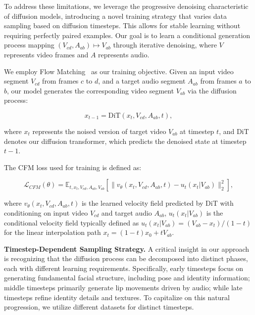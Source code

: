 To address these limitations, we leverage the progressive denoising characteristic of diffusion models, introducing a novel training strategy that varies data sampling based on diffusion timesteps. This allows for stable learning without requiring perfectly paired examples. Our goal is to learn a conditional generation process mapping $(V_{cd}, A_{ab}) \mapsto V_{ab}$ through iterative denoising, where $V$ represents video frames and $A$ represents audio.


We employ Flow Matching~\cite{lipman2022flow} as our training objective. Given an input video segment $V_{cd}$ from frames $c$ to $d$, and a target audio segment $A_{ab}$ from frames $a$ to $b$, our model generates the corresponding video segment $V_{ab}$ via the diffusion process:

\vspace{-1em}
\begin{equation}
x_{t-1} = \text{DiT}(x_t, V_{cd}, A_{ab}, t),
\end{equation}
\vspace{-1em}

where $x_t$ represents the noised version of target video $V_{ab}$ at timestep $t$, and DiT denotes our diffusion transformer, which predicts the denoised state at timestep $t-1$.

The CFM loss used for training is defined as:

\begin{equation}
\mathcal{L}_{CFM}(\theta) = \mathbb{E}_{t,x_t,V_{cd},A_{ab},V_{ab}}\left[\|v_\theta(x_t, V_{cd}, A_{ab}, t) - u_t(x_t|V_{ab})\|_2^2\right],
\end{equation}

where $v_\theta(x_t, V_{cd}, A_{ab}, t)$ is the learned velocity field predicted by DiT with conditioning on input video $V_{cd}$ and target audio $A_{ab}$, $u_t(x_t|V_{ab})$ is the conditional velocity field typically defined as $u_t(x_t|V_{ab}) = (V_{ab} - x_t)/(1 - t)$ for the linear interpolation path $x_t = (1 - t)x_0 + tV_{ab}$.


\textbf{Timestep-Dependent Sampling Strategy.}
A critical insight in our approach is recognizing that the diffusion process can be decomposed into distinct phases, each with different learning requirements. Specifically, early timesteps focus on generating fundamental facial structure, including pose and identity information; middle timesteps primarily generate lip movements driven by audio; while late timesteps refine identity details and textures. To capitalize on this natural progression, we utilize different datasets for distinct timesteps.

